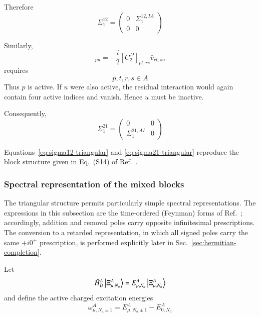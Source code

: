 \documentclass[aip,jcp,reprint,noshowkeys,superscriptaddress]{revtex4-1}
\begin{document}
Therefore
\begin{equation}
  \Sigma_1^{12}
  =
  \begin{pmatrix}
    0 & \Sigma_1^{12,IA}
    \\
    0 & 0
  \end{pmatrix}
  \label{eq:sigma12-triangular}
\end{equation}

Similarly,
\begin{equation}
  [\Sigma_1^{21}]_{pu}
  =
  -\frac{i}{2}
  [C_2^D]_{pt,rs}
  \bar v_{rt,su}
\end{equation}
requires
\begin{equation}
  p,t,r,s\in A
\end{equation}
Thus $p$ is active.  If $u$ were also active, the residual interaction
would again contain four active indices and vanish.  Hence $u$ must be
inactive.

Consequently,
\begin{equation}
  \Sigma_1^{21}
  =
  \begin{pmatrix}
    0 & 0
    \\
    \Sigma_1^{21,AI} & 0
  \end{pmatrix}
  \label{eq:sigma21-triangular}
\end{equation}

Equations~\eqref{eq:sigma12-triangular} and
\eqref{eq:sigma21-triangular} reproduce the block structure given in
Eq.~(S14) of Ref.~\cite{WangFangLi2026}.


\subsubsection{Spectral representation of the mixed blocks}

The triangular structure permits particularly simple spectral
representations.  The expressions in this subsection are the time-ordered
(Feynman) forms of Ref.~\cite{WangFangLi2026}; accordingly, addition and
removal poles carry opposite infinitesimal prescriptions.  The conversion to
a retarded representation, in which all signed poles carry the same
$+i0^+$ prescription, is performed explicitly later in
Sec.~\ref{sec:hermitian-completion}.

Let
\begin{equation}
  \hat H_D^{A}
  \ket{\Xi_{\mu,N_a}^{A}}
  =
  E_{\mu,N_a}^{A}
  \ket{\Xi_{\mu,N_a}^{A}}
\end{equation}
and define the active charged excitation energies
\begin{equation}
  \omega_{\mu,N_a\pm1}^{A}
  =
  E_{\mu,N_a\pm1}^{A}
  -
  E_{0,N_a}^{A}
\end{equation}
\end{document}
